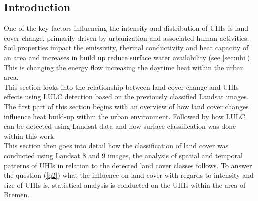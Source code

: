 \documentclass[12pt,a4paper, english,twoside]{scrartcl}
\begin{document}
    \subsection{Introduction}
      One of the key factors influencing the intensity and distribution of \glspl{UHI} is land cover change, primarily driven by urbanization and associated human activities.
      Soil properties impact the emissivity, thermal conductivity and heat capacity of an area and increases in build up reduce surface water availability (see \cref{sec:uhi}).
      This is changing the energy flow increasing the daytime heat within the urban area.
      \\    
      This section looks into the relationship between land cover change and \glspl{UHI} effects using \gls{LULC} detection based on the previously classified Landsat images.
      The first part of this section begins with an overview of how land cover changes influence heat build-up within the urban environment. 
      Followed by how \gls{LULC} can be detected using Landsat data and how surface classification was done within this work. 
      \\
      This section then goes into detail how the classification of land cover was conducted using Landsat 8 and 9 images, the analysis of spatial and temporal patterns of \glspl{UHI} in relation to the detected land cover classes follows.
      To answer the question (\cref{q2}) what the influence on land cover with regards to intensity and size of \glspl{UHI} is, statistical analysis is conducted on the \glspl{UHI} within the area of Bremen. \\
    \newpage
\end{document}
